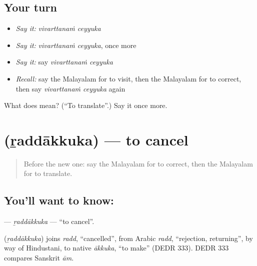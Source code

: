 \subsection*{Your turn}
\begin{itemize}
\raggedright
  \item \emph{Say it:} \emph{vivarttanaṁ ceyyuka}
  \item \emph{Say it:} \emph{vivarttanaṁ ceyyuka}, once more
  \item \emph{Say it:} say \emph{vivarttanaṁ ceyyuka}
  \item \emph{Recall:} say the Malayalam for to visit, then the Malayalam for to correct, then say \emph{vivarttanaṁ ceyyuka} again
\end{itemize}

\begin{tcolorbox}[breakable,colback=teal!4,colframe=teal!35!black,title={Before you move on}]
What does   mean? (\textquotedblleft{}To translate\textquotedblright{}.) Say it once more.
\end{tcolorbox}
\section[\texorpdfstring{\ml{റദ്ദാക്കുക} (ṟaddākkuka)}{റദ്ദാക്കുക (ṟaddākkuka)}]{ (ṟaddākkuka) — to cancel}

\label{lesson:ML-C306-raddakkuka}



\begin{quote}
Before the new one: say the Malayalam for to correct, then the Malayalam for to translate.
\end{quote}

\subsection*{You'll want to know: }
\textbf{} — \emph{ṟaddākkuka} — \textquotedblleft{}to cancel\textquotedblright{}.

\begin{cousinweb}
\textbf{} (\emph{ṟaddākkuka}) joins \emph{radd}, \textquotedblleft{}cancelled\textquotedblright{}, from Arabic \emph{radd}, \textquotedblleft{}rejection, returning\textquotedblright{}, by way of Hindustani, to native \emph{ākkuka}, \textquotedblleft{}to make\textquotedblright{} (DEDR 333). DEDR 333 compares Sanskrit \emph{ām}.
\end{cousinweb}

